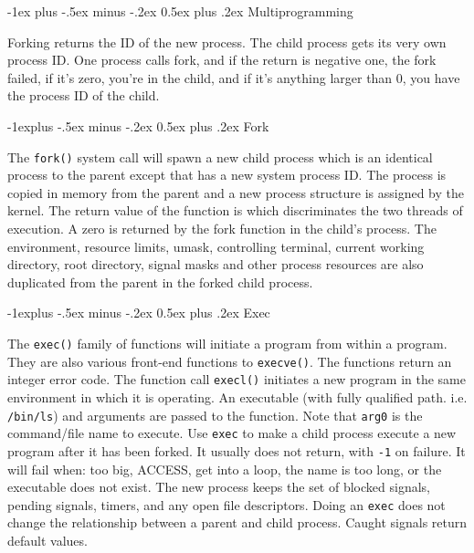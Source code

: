 \documentclass[10pt,landscape, a4paper]{article}
\makeatletter
\renewcommand{\section}{\@startsection{section}{1}{0mm}%
                                {-1ex plus -.5ex minus -.2ex}%
                                {0.5ex plus .2ex}%
                                {\normalfont\large\bfseries}}
\renewcommand{\subsection}{\@startsection{subsection}{2}{0mm}%
                                {-1explus -.5ex minus -.2ex}%
                                {0.5ex plus .2ex}%
                                {\normalfont\normalsize\bfseries}}
\makeatother
\begin{document}
\begin{multicols}{3}


\section{Multiprogramming}

Forking returns the ID of the new process. The child process gets its
very own process ID. One process calls fork, and if the return is negative
one, the fork failed, if it's zero, you're in the child, and if it's anything
larger than 0, you have the process ID of the child.

\subsection{Fork}

The \texttt{fork()} system call will spawn a new child process which is an 
identical process to the parent except that has a new system process ID. 
The process is copied in memory from the parent and a new process structure 
is assigned by the kernel. The return value of the function is which 
discriminates the two threads of execution. A zero is returned by the 
fork function in the child's process.
The environment, resource limits, umask, controlling terminal, 
current working directory, root directory, signal masks and other 
process resources are also duplicated from the parent in the forked 
child process.



\subsection{Exec}

The \texttt{exec()} family of functions will initiate a program from within a program. 
They are also various front-end functions to \texttt{execve()}.
The functions return an integer error code.
The function call \texttt{execl()} initiates a new program in the same environment 
in which it is operating. An executable (with fully qualified path. i.e. \texttt{/bin/ls}) 
and arguments are passed to the function. Note that \texttt{arg0} is the command/file 
name to execute.
Use \texttt{exec} to make a child process execute a new program
after it has been forked. It usually does not return, with \texttt{-1}
on failure. It will fail when: too big, ACCESS, get into a loop, the name
is too long, or the executable does not exist. The new process keeps the
set of blocked signals, pending signals, timers, and any open file 
descriptors. Doing an \texttt{exec} does not change the relationship
between a parent and child process. Caught signals return default values.


\end{multicols}
\end{document}
